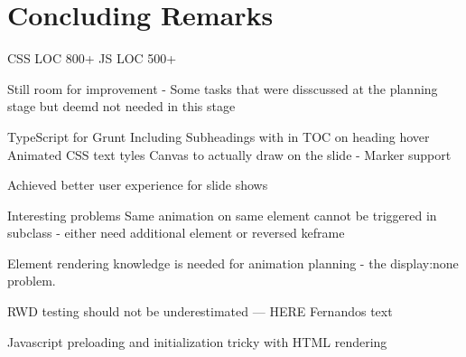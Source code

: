 %
%
% 
% 
% 


\chapter{Concluding Remarks}

\label{chap:Concl}

CSS LOC 800+
JS LOC 500+



Still room for improvement - Some tasks that were disscussed at the planning stage but deemd not needed in this stage

TypeScript for Grunt
Including Subheadings with in TOC on heading hover
Animated CSS text tyles
Canvas to actually draw on the slide - Marker support


Achieved better user experience for slide shows

Interesting problems
Same animation on same element cannot be triggered in subclass - either need additional element or reversed keframe

Element rendering knowledge is needed for animation planning - the display:none problem.

RWD testing should not be underestimated --- HERE Fernandos text

Javascript preloading and initialization tricky with HTML rendering